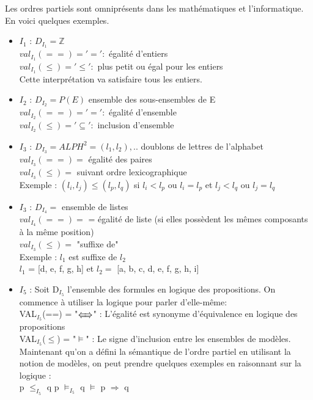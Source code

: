 {Les ordres partiels sont omniprésents dans les mathématiques et l'informatique.
En voici quelques exemples.
\begin{itemize}
\item \underline{$I_{1}$} : $D_{I_{1}} =  \mathbb{Z}$ \\
$ val_{I_{1}}(==) = '=' :$ égalité d'entiers \\
$ val_{I_{1}}(\leq) = '\leq' :$ plus petit ou égal pour les entiers\\
Cette interprétation va satisfaire tous les entiers.
\item \underline{$I_{2}$} : $D_{I_{2}} =  P(E)$ ensemble des sous-ensembles de E\\
$ val_{I_{2}}(==) = '=' :$ égalité d'ensemble \\
$ val_{I_{2}}(\leq) = '\subseteq' :$ inclusion d'ensemble
\item \underline{$I_{3}$} : $D_{I_{3}} = ALPH^{2} = {(l_{1},l_{2}),..}$ doublons de lettres de l'alphabet\\
$ val_{I_{3}}(==) = $ égalité des paires \\
$ val_{I_{3}}(\leq) =$ suivant ordre lexicographique\\
Exemple : $(l_{i},l_{j}) \leq (l_{p},l_{q})$ si $ l_{i} < l_{p}$ ou $ l_{i} = l_{p}$ et $ l_{j} < l_{q}$ ou $ l_{j} = l_{q}$
\item \underline{$I_{3}$} : $D_{I_{4}} =$ ensemble de listes\\
$ val_{I_{4}}(==) = $ = égalité de liste (si elles possèdent les mêmes composants à la même position)\\
$ val_{I_{3}}(\leq) =$ "suffixe de" \\
Exemple : $l_{1} $ est suffixe de $l_{2}$ \\
$l_{1} $ = [d, e, f, g, h] et $l_{2} =$ [a, b, c, d, e, f, g, h, i]
\item \underline{$I_{5}$} : Soit D$_{I_{5}}$ l'ensemble des formules en logique des propositions. On commence à utiliser la logique pour parler d'elle-même:\\
VAL$_{I_{5}}$(==) = "$\LRarrow$" : L'égalité est synonyme d'équivalence en logique des propositions \\
VAL$_{I_{5}}$($\leq$) = "$\models$" : Le signe d'inclusion entre les ensembles de modèles.
Maintenant qu'on a défini la sémantique de l'ordre partiel en utilisant la notion de modèles, on peut prendre quelques exemples en raisonnant sur la logique :\\
p $\leq_{I_{5}}$ q   \hspace{1.5cm} p $\models_{I_{5}}$ q \hspace{1.5cm} $\models$ p $\Rightarrow$ q

\end{itemize}}
